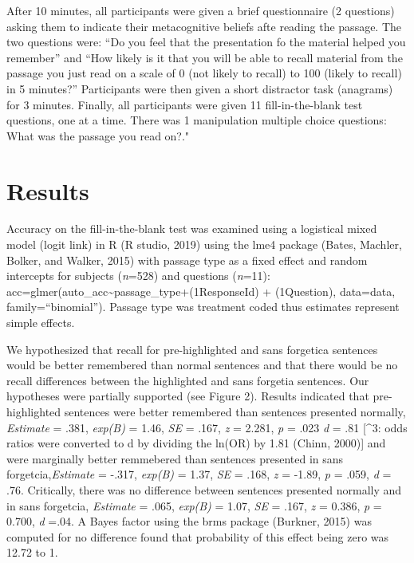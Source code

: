\documentclass[pdf]{apa6}
\begin{document}
After 10 minutes, all participants were given a brief questionnaire (2 questions) asking them to indicate their metacognitive beliefs afte reading the passage. The two questions were: \enquote{Do you feel that the presentation fo the material helped you remember} and \enquote{How likely is it that you will be able to recall material from the passage you just read on a scale of 0 (not likely to recall) to 100 (likely to recall) in 5 minutes?} Participants were then given a short distractor task (anagrams) for 3 minutes. Finally, all participants were given 11 fill-in-the-blank test questions, one at a time. There was 1 manipulation multiple choice questions: What was the passage you read on?."

\hypertarget{results-2}{%
\section{Results}\label{results-2}}

Accuracy on the fill-in-the-blank test was examined using a logistical mixed model (logit link) in R (R studio, 2019) using the lme4 package (Bates, Machler, Bolker, and Walker, 2015) with passage type as a fixed effect and random intercepts for subjects (\emph{n}=528) and questions (\emph{n}=11): acc=glmer(auto\_acc\textasciitilde{}passage\_type+(1\textbar{}ResponseId) + (1\textbar{}Question), data=data, family=\enquote{binomial}). Passage type was treatment coded thus estimates represent simple effects.

We hypothesized that recall for pre-highlighted and sans forgetica sentences would be better remembered than normal sentences and that there would be no recall differences between the highlighted and sans forgetia sentences. Our hypotheses were partially supported (see Figure 2). Results indicated that pre-highlighted sentences were better remembered than sentences presented normally, \emph{Estimate} = .381, \emph{exp(B)} = 1.46, \emph{SE} = .167, \emph{z} = 2.281, \emph{p} = .023 \emph{d} = .81 {[}\^{}3: odds ratios were converted to d by dividing the ln(OR) by 1.81 (Chinn, 2000){]} and were marginally better remmebered than sentences presented in sans forgetcia,\emph{Estimate} = -.317, \emph{exp(B)} = 1.37, \emph{SE} = .168, \emph{z} = -1.89, \emph{p} = .059, \emph{d} = .76. Critically, there was no difference between sentences presented normally and in sans forgetcia, \emph{Estimate} = .065, \emph{exp(B)} = 1.07, \emph{SE} = .167, \emph{z} = 0.386, \emph{p} = 0.700, \emph{d} =.04. A Bayes factor using the brms package (Burkner, 2015) was computed for no difference found that probability of this effect being zero was 12.72 to 1.
\end{document}
